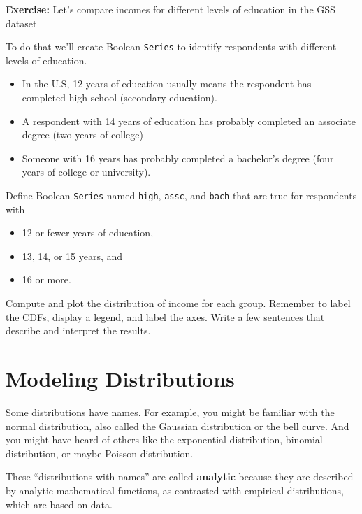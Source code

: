 \textbf{Exercise:} Let's compare incomes for different levels of
education in the GSS dataset

To do that we'll create Boolean \passthrough{\lstinline!Series!} to
identify respondents with different levels of education.

\begin{itemize}
\item
  In the U.S, 12 years of education usually means the respondent has
  completed high school (secondary education).
\item
  A respondent with 14 years of education has probably completed an
  associate degree (two years of college)
\item
  Someone with 16 years has probably completed a bachelor's degree (four
  years of college or university).
\end{itemize}

Define Boolean \passthrough{\lstinline!Series!} named
\passthrough{\lstinline!high!}, \passthrough{\lstinline!assc!}, and
\passthrough{\lstinline!bach!} that are true for respondents with

\begin{itemize}
\item
  12 or fewer years of education,
\item
  13, 14, or 15 years, and
\item
  16 or more.
\end{itemize}

Compute and plot the distribution of income for each group. Remember to
label the CDFs, display a legend, and label the axes. Write a few
sentences that describe and interpret the results.

\hypertarget{modeling-distributions}{%
\section{Modeling Distributions}\label{modeling-distributions}}

Some distributions have names. For example, you might be familiar with
the normal distribution, also called the Gaussian distribution or the
bell curve. And you might have heard of others like the exponential
distribution, binomial distribution, or maybe Poisson distribution.

These ``distributions with names'' are called \textbf{analytic} because
they are described by analytic mathematical functions, as contrasted
with empirical distributions, which are based on data.

